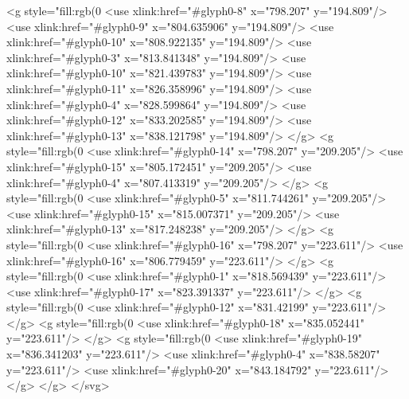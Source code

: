 <g style="fill:rgb(0%
  <use xlink:href="#glyph0-8" x="798.207" y="194.809"/>
  <use xlink:href="#glyph0-9" x="804.635906" y="194.809"/>
  <use xlink:href="#glyph0-10" x="808.922135" y="194.809"/>
  <use xlink:href="#glyph0-3" x="813.841348" y="194.809"/>
  <use xlink:href="#glyph0-10" x="821.439783" y="194.809"/>
  <use xlink:href="#glyph0-11" x="826.358996" y="194.809"/>
  <use xlink:href="#glyph0-4" x="828.599864" y="194.809"/>
  <use xlink:href="#glyph0-12" x="833.202585" y="194.809"/>
  <use xlink:href="#glyph0-13" x="838.121798" y="194.809"/>
</g>
<g style="fill:rgb(0%
  <use xlink:href="#glyph0-14" x="798.207" y="209.205"/>
  <use xlink:href="#glyph0-15" x="805.172451" y="209.205"/>
  <use xlink:href="#glyph0-4" x="807.413319" y="209.205"/>
</g>
<g style="fill:rgb(0%
  <use xlink:href="#glyph0-5" x="811.744261" y="209.205"/>
  <use xlink:href="#glyph0-15" x="815.007371" y="209.205"/>
  <use xlink:href="#glyph0-13" x="817.248238" y="209.205"/>
</g>
<g style="fill:rgb(0%
  <use xlink:href="#glyph0-16" x="798.207" y="223.611"/>
  <use xlink:href="#glyph0-16" x="806.779459" y="223.611"/>
</g>
<g style="fill:rgb(0%
  <use xlink:href="#glyph0-1" x="818.569439" y="223.611"/>
  <use xlink:href="#glyph0-17" x="823.391337" y="223.611"/>
</g>
<g style="fill:rgb(0%
  <use xlink:href="#glyph0-12" x="831.42199" y="223.611"/>
</g>
<g style="fill:rgb(0%
  <use xlink:href="#glyph0-18" x="835.052441" y="223.611"/>
</g>
<g style="fill:rgb(0%
  <use xlink:href="#glyph0-19" x="836.341203" y="223.611"/>
  <use xlink:href="#glyph0-4" x="838.58207" y="223.611"/>
  <use xlink:href="#glyph0-20" x="843.184792" y="223.611"/>
</g>
</g>
</svg>
